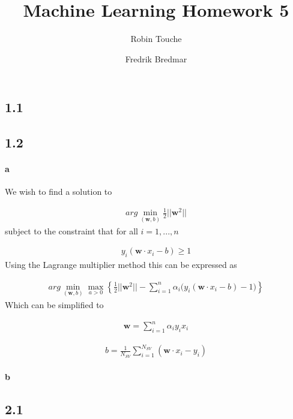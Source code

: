 \documentclass{article}
\author{
  Robin Touche \\
  \and
  Fredrik Bredmar
}
\title{Machine Learning Homework 5}
\begin{document}
\maketitle

\subsection*{1.1}

\subsection*{1.2}
\paragraph{a}

We wish to find a solution to

\begin{align}
  arg \min_{(\mathbf{w}, b)} \frac{1}{2} \lvert \rvert \mathbf{w}^2 \lvert \rvert
\end{align}
subject to the constraint that for all $i = 1, ... , n$

\begin{align}
  y_i (\mathbf{w} \cdot x_i - b) \geq 1
\end{align}
Using the Lagrange multiplier method this can be expressed as

\begin{align}
  arg \min_{(\mathbf{w}, b)} \max_{a > 0} \left\{ \frac{1}{2} \lvert \rvert \mathbf{w}^2 \lvert \rvert -
      \sum_{i = 1}^{n}\alpha_i \big( y_i \left( \mathbf{w} \cdot x_i - b \right) - 1 \big) \right\}
\end{align}
Which can be simplified to

\begin{align}
  \mathbf{w} = \sum_{i = 1}^{n}\alpha_i y_i x_i
\end{align}


\begin{align}
  b = \frac{1}{N_{SV}} \sum_{i = 1}^{N_{SV}} \left( \mathbf{w} \cdot x_i - y_i \right)
\end{align}

\paragraph{b}

\subsection*{2.1}
\end{document}
